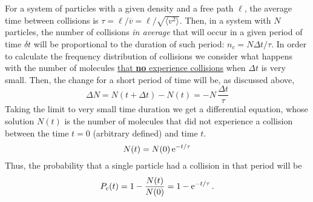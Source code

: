 For a system of particles with a given density and a free path $\ell$, the average time between collisions is $\tau = \ell/\overline{v}= \ell/ \sqrt{\langle v^{2} \rangle}$. Then, in a system with $N$ particles, the number of collisions \emph{in average} that will occur in a given period of time $\delta t$ will be proportional to the duration of such period: $n_{c} = N \Delta t/\tau$. In order to calculate the frequency distribution of collisions we consider what happens with the number of molecules \underline{that \textbf{no} experience collisions} when $\Delta t$ is very small. Then, the change for a short period of time will be, as discussed above,
\begin{equation}
  \label{Q:rates-freq-collision-diff}
  \Delta N = N(t+\Delta t) - N(t) = - N \, \frac{\Delta t}{\tau}
\end{equation}
Taking the limit to very small time duration we get a differential equation, whose solution $N(t)$ is the number of molecules that did not experience a collision between the time $t=0$ (arbitrary defined) and time $t$. 
\begin{equation}
  \label{Q:rates-freq-collision-no-col}
  N(t) = N(0)\, \mathrm{e}^{-t/\tau}
\end{equation}
Thus, the probability that a single particle had a collision in that period will be 
\begin{equation}
  \label{Q:rates-freq-collision-prob-dist}
  P_{c}(t) = 1- \frac{N(t)}{N(0)} = 1 - \mathrm{e}^{-t/\tau} \,.
\end{equation}


